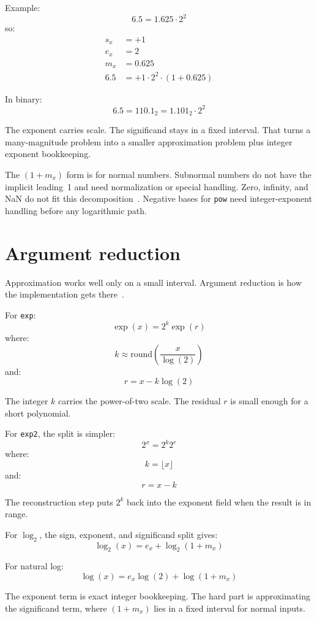 \documentclass[manuscript, nonacm]{acmart}
\begin{document}
  Example:
  \[ 6.5 = 1.625 \cdot 2^2 \]
  so:
  \begin{align*}
    s_x &= +1 \\
    e_x &= 2 \\
    m_x &= 0.625 \\
    6.5 &= +1 \cdot 2^2 \cdot (1 + 0.625)
  \end{align*}

  In binary:
  \[ 6.5 = 110.1_2 = 1.101_2 \cdot 2^2 \]

  The exponent carries scale. The significand stays in a fixed interval.
  That turns a many-magnitude problem into a smaller approximation problem plus
  integer exponent bookkeeping.

  The $(1 + m_x)$ form is for normal numbers. Subnormal numbers do not have
  the implicit leading~1 and need normalization or special handling. Zero,
  infinity, and NaN do not fit this decomposition~\cite{ieee}. Negative bases
  for \texttt{pow} need integer-exponent handling before any logarithmic path.



  \section{Argument reduction}

  Approximation works well only on a small interval. Argument reduction is
  how the implementation gets there~\cite{muller,handbook}.

  For \texttt{exp}:
  \[ \exp(x) = 2^k \exp(r) \]
  where:
  \[ k \approx \mathrm{round}\!\left(\frac{x}{\log(2)}\right) \]
  and:
  \[ r = x - k\log(2) \]

  The integer $k$ carries the power-of-two scale. The residual $r$ is small
  enough for a short polynomial.

  For \texttt{exp2}, the split is simpler:
  \[ 2^x = 2^k 2^r \]
  where:
  \[ k = \lfloor x \rfloor \]
  and:
  \[ r = x - k \]

  The reconstruction step puts $2^k$ back into the exponent field when the
  result is in range.

  For $\log_2$, the sign, exponent, and significand split gives:
  \[ \log_2(x) = e_x + \log_2(1 + m_x) \]

  For natural log:
  \[ \log(x) = e_x \log(2) + \log(1 + m_x) \]

  The exponent term is exact integer bookkeeping. The hard part is
  approximating the significand term, where $(1 + m_x)$ lies in a fixed
  interval for normal inputs.
\end{document}

